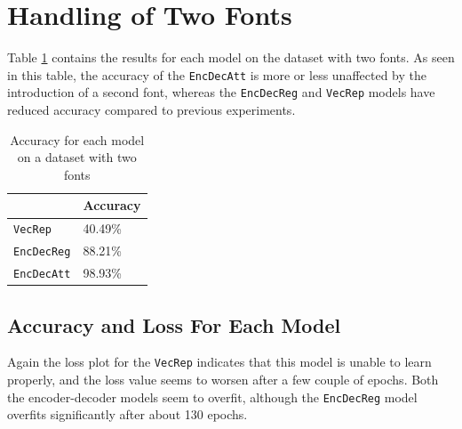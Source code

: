 
\section{Handling of Two Fonts}
\label{sec:handling_of_two_fonts}
Table \ref{table:accuracy_two_fonts} contains the results for each model on the dataset with two fonts. As seen in this table, the accuracy of the {\tt EncDecAtt} is more or less unaffected by the introduction of a second font, whereas the {\tt EncDecReg} and {\tt VecRep} models have reduced accuracy compared to previous experiments. 

\begin{table}[H]
    \centering
    \begin{tabular}{|l|l|}
        \hline 
                                        & \textbf{Accuracy}         \\ \hline
        {\tt VecRep }                   & 40.49\%                   \\ \hline
        {\tt EncDecReg}                 & 88.21\%                   \\ \hline
        {\tt EncDecAtt}                 & 98.93\%                   \\ \hline
    \end{tabular}
    \caption{Accuracy for each model on a dataset with two fonts}
    \label{table:accuracy_two_fonts}
\end{table}

\subsection{Accuracy and Loss For Each Model}
\newpage
{}

Again the loss plot for the {\tt VecRep} indicates that this model is unable to learn properly, and the loss value seems to worsen after a few couple of epochs. Both the encoder-decoder models seem to overfit, although the {\tt EncDecReg} model overfits significantly after about 130 epochs.

